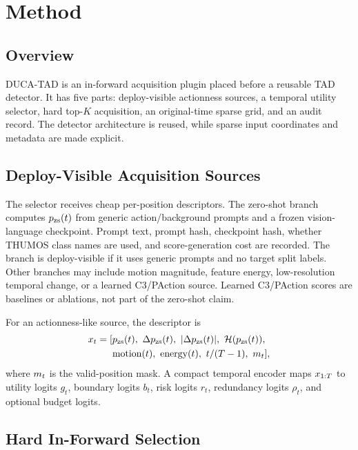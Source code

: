 \section{Method}

\subsection{Overview}

DUCA-TAD is an in-forward acquisition plugin placed before a reusable TAD detector.
It has five parts: deploy-visible actionness sources, a temporal utility
selector, hard top-$K$ acquisition, an original-time sparse grid, and an audit
record. The detector architecture is reused, while sparse input coordinates and
metadata are made explicit.

\subsection{Deploy-Visible Acquisition Sources}

The selector receives cheap per-position descriptors. The zero-shot branch
computes $p_{\mathrm{zs}}(t)$ from generic action/background prompts and a frozen
vision-language checkpoint. Prompt text, prompt hash, checkpoint hash, whether
THUMOS class names are used, and score-generation cost are recorded. The branch
is deploy-visible if it uses generic prompts and no target split labels. Other
branches may include motion magnitude, feature energy, low-resolution temporal
change, or a learned C3/PAction source. Learned C3/PAction scores are baselines
or ablations, not part of the zero-shot claim.

For an actionness-like source, the descriptor is
\begin{equation}
\begin{split}
    x_t = [&p_{\mathrm{zs}}(t),\ \Delta p_{\mathrm{zs}}(t),\ |\Delta p_{\mathrm{zs}}(t)|,\
           \mathcal{H}(p_{\mathrm{zs}}(t)),\\
           &\mathrm{motion}(t),\ \mathrm{energy}(t),\
           t/(T-1),\ m_t],
\end{split}
    \label{eq:source_features}
\end{equation}
where $m_t$ is the valid-position mask. A compact temporal encoder maps
$x_{1:T}$ to utility logits $g_t$, boundary logits $b_t$, risk logits
$r_t$, redundancy logits $\rho_t$, and optional budget logits.

\subsection{Hard In-Forward Selection}

